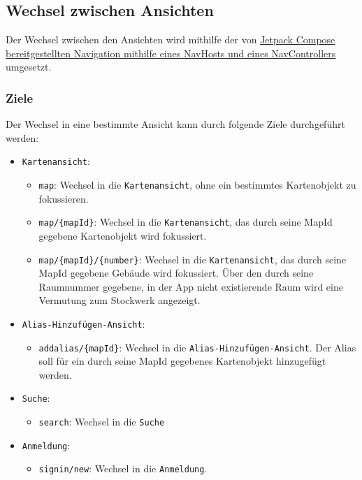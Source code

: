 \subsection{Wechsel zwischen Ansichten}\label{App_Navigation_Wechsel}
Der Wechsel zwischen den Ansichten wird mithilfe der von \href{https://developer.android.com/jetpack/compose/navigation?hl=fr}
{Jetpack Compose bereitgestellten Navigation mithilfe eines NavHosts und eines NavControllers} 
umgesetzt.

\subsubsection*{Ziele}\label{App_Navigation_Ziele}
Der Wechsel in eine bestimmte Ansicht kann durch folgende Ziele durchgeführt werden:
\begin{itemize}
    \item \texttt{Kartenansicht}: 
    \begin{itemize}
        \item \texttt{map}: Wechsel in die \texttt{Kartenansicht}, ohne ein bestimmtes Kartenobjekt zu fokussieren.
        \item \texttt{map/\{mapId\}}: Wechsel in die \texttt{Kartenansicht}, das durch seine MapId gegebene Kartenobjekt wird fokussiert.
        \item \texttt{map/\{mapId\}/\{number\}}: Wechsel in die \texttt{Kartenansicht}, das durch seine MapId gegebene Gebäude wird fokussiert. 
        Über den durch seine Raumnummer gegebene, in der App nicht existierende Raum wird eine Vermutung zum Stockwerk angezeigt.
    \end{itemize}
    \item \texttt{Alias-Hinzufügen-Ansicht}:
    \begin{itemize}
        \item \texttt{addalias/\{mapId\}}: Wechsel in die \texttt{Alias-Hinzufügen-Ansicht}. 
        Der Alias soll für ein durch seine MapId gegebenes Kartenobjekt hinzugefügt werden.
    \end{itemize}
    \item \texttt{Suche}: 
    \begin{itemize}
        \item \texttt{search}: Wechsel in die \texttt{Suche}
    \end{itemize}
    \item \texttt{Anmeldung}: \begin{itemize}
        \item \texttt{signin/new}: Wechsel in die \texttt{Anmeldung}.

\end{itemize}
\end{itemize}

